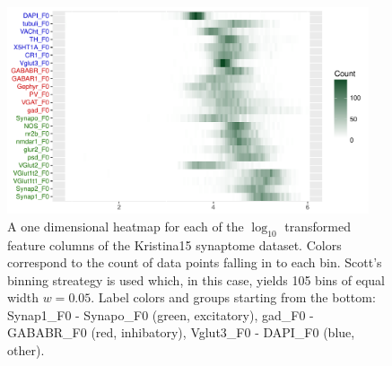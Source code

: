 \documentclass[simplex.tex]{subfiles}
\begin{document}
\begin{figure}[!h]
\begin{cframed}
\centering
\includegraphics[width=0.95\textwidth]{../../figs/201701-meda-1dheat.pdf}
\caption{A one dimensional heatmap for each of the $\log_{10}$
  transformed feature columns of the Kristina15 synaptome dataset.
  Colors correspond to the count of data points falling in to each bin.
  Scott's binning streategy is used which, in this case, yields 105 bins
  of equal width $w = 0.05$. 
  Label colors and groups starting from the bottom:
  \textcolor{jgreen}{Synap1\_F0 - Synapo\_F0 (green, excitatory)},
  \textcolor{jred}{gad\_F0 - GABABR\_F0 (red, inhibatory)},
  \textcolor{jblue}{Vglut3\_F0 - DAPI\_F0 (blue, other)}.
  }
\label{fig:meda}
\end{cframed}
\end{figure}
\end{document}
